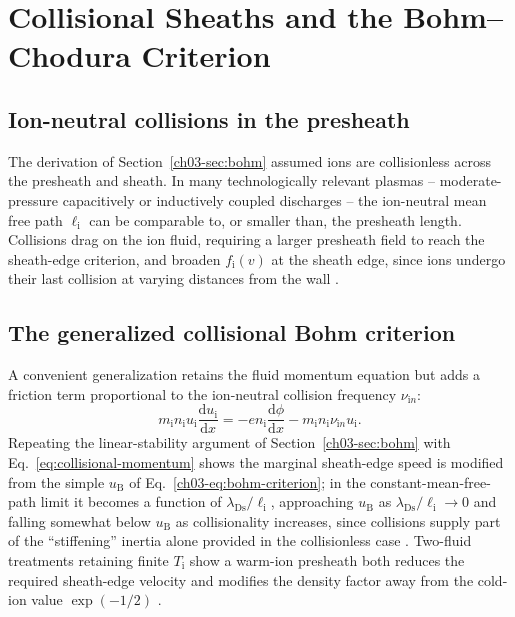 \section{Collisional Sheaths and the Bohm--Chodura Criterion}
\label{sec:collisional}

\subsection{Ion-neutral collisions in the presheath}

The derivation of Section~\ref{ch03-sec:bohm} assumed ions are collisionless across the presheath and sheath. In many technologically relevant plasmas -- moderate-pressure capacitively or inductively coupled discharges -- the ion-neutral mean free path $\ell_{\mathrm{i}}$ can be comparable to, or smaller than, the presheath length. Collisions drag on the ion fluid, requiring a larger presheath field to reach the sheath-edge criterion, and broaden $f_{\mathrm{i}}(v)$ at the sheath edge, since ions undergo their last collision at varying distances from the wall \cite{ref0009,ref0024}.

\subsection{The generalized collisional Bohm criterion}

A convenient generalization retains the fluid momentum equation but adds a friction term proportional to the ion-neutral collision frequency $\nu_{\mathrm{i}n}$:
\begin{equation}
m_{\mathrm{i}} n_{\mathrm{i}} u_{\mathrm{i}} \frac{\mathrm{d}u_{\mathrm{i}}}{\mathrm{d}x} = -e n_{\mathrm{i}} \frac{\mathrm{d}\phi}{\mathrm{d}x} - m_{\mathrm{i}} n_{\mathrm{i}} \nu_{\mathrm{i}n} u_{\mathrm{i}}.
\label{eq:collisional-momentum}
\end{equation}
Repeating the linear-stability argument of Section~\ref{ch03-sec:bohm} with Eq.~\eqref{eq:collisional-momentum} shows the marginal sheath-edge speed is modified from the simple $u_{\mathrm{B}}$ of Eq.~\eqref{ch03-eq:bohm-criterion}; in the constant-mean-free-path limit it becomes a function of $\lambda_{\mathrm{Ds}}/\ell_{\mathrm{i}}$, approaching $u_{\mathrm{B}}$ as $\lambda_{\mathrm{Ds}}/\ell_{\mathrm{i}} \to 0$ and falling somewhat below $u_{\mathrm{B}}$ as collisionality increases, since collisions supply part of the ``stiffening'' inertia alone provided in the collisionless case \cite{ref0009,ref0024,ref0015}. Two-fluid treatments retaining finite $T_{\mathrm{i}}$ show a warm-ion presheath both reduces the required sheath-edge velocity and modifies the density factor away from the cold-ion value $\exp(-1/2)$ \cite{ref0023}.

